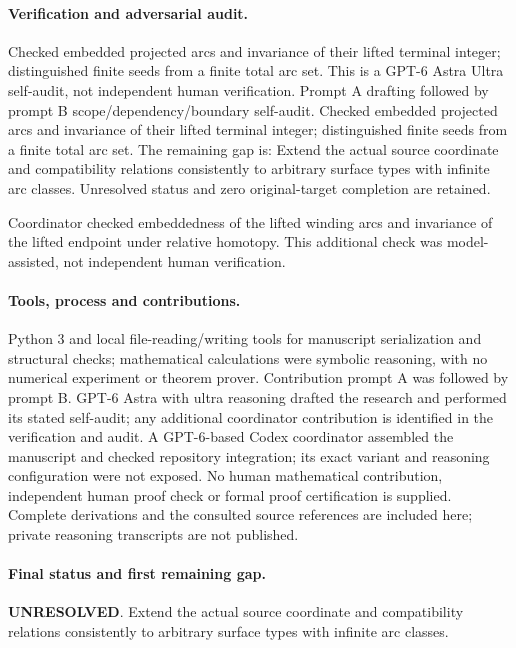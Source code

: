 \documentclass[11pt]{article}
\begin{document}
\paragraph{Verification and adversarial audit.}
Checked embedded projected arcs and invariance of their lifted terminal integer; distinguished finite seeds from a finite total arc set. This is a GPT-6 Astra Ultra self-audit, not independent human verification. Prompt A drafting followed by prompt B scope/dependency/boundary self-audit. Checked embedded projected arcs and invariance of their lifted terminal integer; distinguished finite seeds from a finite total arc set. The remaining gap is: Extend the actual source coordinate and compatibility relations consistently to arbitrary surface types with infinite arc classes. Unresolved status and zero original-target completion are retained.

Coordinator checked embeddedness of the lifted winding arcs and invariance of the lifted endpoint under relative homotopy. This additional check was model-assisted, not independent human verification.

\paragraph{Tools, process and contributions.}
Python 3 and local file-reading/writing tools for manuscript serialization and structural checks; mathematical calculations were symbolic reasoning, with no numerical experiment or theorem prover. Contribution prompt A was followed by prompt B. GPT-6 Astra with ultra reasoning drafted the research and performed its stated self-audit; any additional coordinator contribution is identified in the verification and audit. A GPT-6-based Codex coordinator assembled the manuscript and checked repository integration; its exact variant and reasoning configuration were not exposed. No human mathematical contribution, independent human proof check or formal proof certification is supplied. Complete derivations and the consulted source references are included here; private reasoning transcripts are not published.

\paragraph{Final status and first remaining gap.}
\textbf{UNRESOLVED}. Extend the actual source coordinate and compatibility relations consistently to arbitrary surface types with infinite arc classes.
\end{document}
